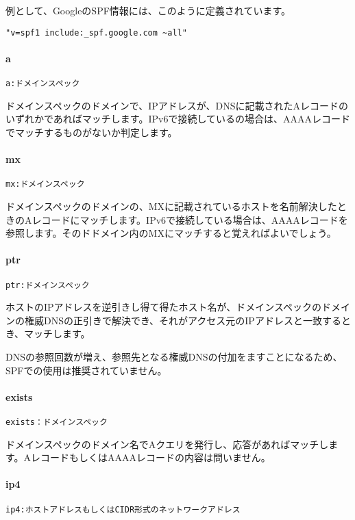 例として、GoogleのSPF情報には、このように定義されています。

\begin{verbatim}
"v=spf1 include:_spf.google.com ~all"
\end{verbatim}

\paragraph{a}
\begin{verbatim}
a:ドメインスペック
\end{verbatim}
ドメインスペックのドメインで、IPアドレスが、DNSに記載されたAレコードのいずれかであればマッチします。IPv6で接続しているの場合は、AAAAレコードでマッチするものがないか判定します。

\paragraph{mx}
\begin{verbatim}
mx:ドメインスペック
\end{verbatim}
ドメインスペックのドメインの、MXに記載されているホストを名前解決したときのAレコードにマッチします。IPv6で接続している場合は、AAAAレコードを参照します。そのドドメイン内のMXにマッチすると覚えればよいでしょう。

\paragraph{ptr}
\begin{verbatim}
ptr:ドメインスペック
\end{verbatim}
ホストのIPアドレスを逆引きし得て得たホスト名が、ドメインスペックのドメインの権威DNSの正引きで解決でき、それがアクセス元のIPアドレスと一致するとき、マッチします。

DNSの参照回数が増え、参照先となる権威DNSの付加をますことになるため、SPFでの使用は推奨されていません。

\paragraph{exists}
\begin{verbatim}
exists：ドメインスペック
\end{verbatim}
ドメインスペックのドメイン名でAクエリを発行し、応答があればマッチします。AレコードもしくはAAAAレコードの内容は問いません。

\paragraph{ip4}
\begin{verbatim}
ip4:ホストアドレスもしくはCIDR形式のネットワークアドレス
\end{verbatim}

